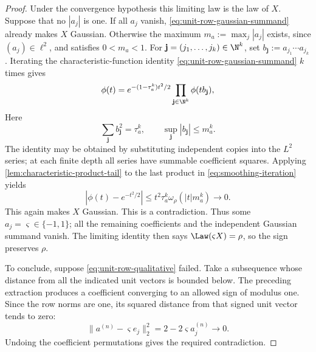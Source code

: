 \begin{proof}
Under the convergence hypothesis this limiting law is the law of $X$.
Suppose that no $|a_j|$ is one.  If all $a_j$ vanish,
\eqref{eq:unit-row-gaussian-summand} already makes $X$ Gaussian.
Otherwise the maximum
$m_a:=\max_j|a_j|$ exists, since $(a_j)\in\ell^2$, and satisfies
$0<m_a<1$.  For
$\mathbf j=(j_1,\ldots,j_k)\in\N^k$, set
$b_{\mathbf j}:=a_{j_1}\cdots a_{j_k}$.
Iterating the characteristic-function identity
\eqref{eq:unit-row-gaussian-summand} $k$ times gives
\begin{equation}
 \phi(t)=e^{-(1-\tau_a^k)t^2/2}
       \prod_{\mathbf j\in\N^k}\phi(tb_{\mathbf j}),
 \label{eq:smoothing-iteration}
\end{equation}
Here
\[
 \sum_{\mathbf j} b_{\mathbf j}^2=\tau_a^k,
 \qquad \sup_{\mathbf j}|b_{\mathbf j}|\leq m_a^k.
\]
The identity may be obtained by substituting independent copies into
the $L^2$ series; at each finite depth all series have summable
coefficient squares.  Applying
\cref{lem:characteristic-product-tail} to the last product in
\eqref{eq:smoothing-iteration} yields
\[
 |\phi(t)-e^{-t^2/2}|
 \leq t^2\tau_a^k\omega_\rho(|t|m_a^k)\longrightarrow0.
\]
This again makes $X$ Gaussian.
This is a contradiction.
Thus some
$a_j=\varsigma\in\{-1,1\}$; all the remaining coefficients and
the independent Gaussian summand vanish.  The limiting identity then says
$\Law(\varsigma X)=\rho$, so the sign preserves $\rho$.

To conclude, suppose \eqref{eq:unit-row-qualitative} failed.
Take a subsequence whose distance from all the indicated unit vectors is
bounded below.
The preceding extraction produces a coefficient converging to an allowed sign
of modulus one.
Since the row norms are one, its squared distance from that signed unit
vector tends to zero:
\[
 \|a^{(n)}-\varsigma e_j\|_2^2
       =2-2\varsigma a_j^{(n)}\longrightarrow0.
\]
Undoing the coefficient permutations gives the required contradiction.
\end{proof}

